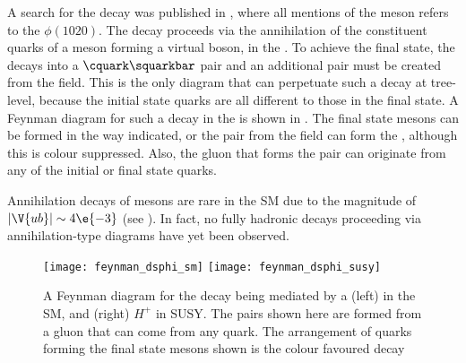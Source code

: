 A search for the decay \btodsphi was published in , where all mentions of
the \phii meson refers to the $\phi(1020)$.
The decay \btodsphi proceeds via the annihilation of the constituent quarks of a \Bp meson
forming a virtual \Wp boson, in the \sm.
To achieve the final state, the \Wp decays into a $\cquark\squarkbar$ pair and an additional
\ssbar pair must be created from the \QCD field.
This is the only diagram that can perpetuate such a decay at tree-level, because the initial state
quarks are all different to those in the final state.
A Feynman diagram for such a decay in the \sm
is shown in .
The final state mesons can be formed in the way indicated, or the \ssbar pair from the \QCD field
can form the \phii, although this is colour suppressed.
Also, the gluon that forms the \ssbar pair can originate from any of the initial or final state
quarks.

Annihilation decays of \Bp mesons are rare in the SM due to the magnitude of
$|\V{ub}|\sim4\e{-3}$ (see ).
In fact, no fully hadronic decays proceeding via annihilation-type diagrams have yet been
observed.


\begin{figure}
  \begin{center}
    \texttt{[image: feynman\_dsphi\_sm]}
    \texttt{[image: feynman\_dsphi\_susy]}
    \caption[Feynman diagram for the decay \btodsphi]
    {
      A Feynman diagram for the decay \btodsphi being mediated by a
      (left) \Wp in the SM, and
      (right) $H^+$ in SUSY.
      The \ssbar pairs shown here are formed from a gluon that can come from any quark.
      The arrangement of quarks forming the final state mesons shown is the colour favoured decay
    }
    \label{fig:dsphi:feyn}
  \end{center}
\end{figure}



